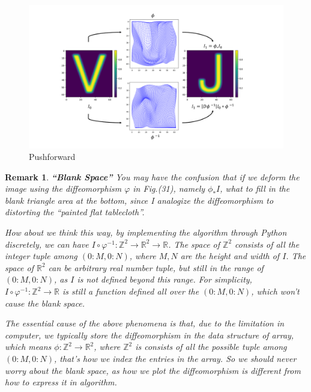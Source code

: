 \documentclass[a4paper]{article}
\theoremstyle{definition}
\theoremstyle{plain}
\newtheorem{remark}{Remark}
\begin{document}
\begin{figure}[H]
\centering
\includegraphics[scale=0.11]{figure/pushforward.png}
\caption{Pushforward}
\end{figure}

\begin{remark}
\textbf{``Blank Space''}
You may have the confusion that if we deform the image using the diffeomorphism $\varphi$ in Fig.(31), namely $\phi_*I$, what to fill in the blank triangle area at the bottom, since I analogize the diffeomorphism to distorting the ``painted flat tablecloth''.

How about we think this way, by implementing the algorithm through Python discretely, we can have $I\circ\varphi^{-1}:\mathbb{Z}^2\rightarrow\mathbb{R}^2\rightarrow\mathbb{R}$. The space of $\mathbb{Z}^2$ consists of all the integer tuple among $(0:M,0:N)$, where $M,N$ are the height and width of $I$. The space of $\mathbb{R}^2$ can be arbitrary real number tuple, but still in the range of $(0:M,0:N)$, as $I$ is not defined beyond this range. For simplicity, $I\circ\varphi^{-1}:\mathbb{Z}^2\rightarrow\mathbb{R}$ is still a function defined all over the $(0:M,0:N)$, which won't cause the blank space.

The essential cause of the above phenomena is that, due to the limitation in computer, we typically store the diffeomorphism in the data structure of array, which means $\phi:\mathbb{Z}^2\rightarrow\mathbb{R}^2$, where $\mathbb{Z}^2$ is consists of all the possible tuple among $(0:M,0:N)$, that's how we index the entries in the array. So we should never worry about the blank space, as how we plot the diffeomorphism is different from how to express it in algorithm.
\end{remark}
\end{document}
